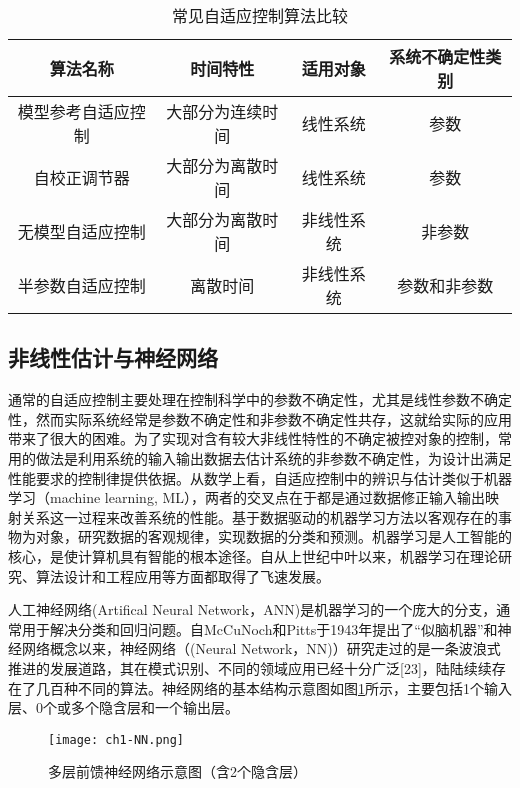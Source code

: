 \begin{table}
\centering
\caption{常见自适应控制算法比较}\label{tab:adaptive}
\begin{tabular*}{0.9\textwidth}{@{\extracolsep{\fill}}cccc}
\toprule
算法名称		&时间特性	&适用对象	&系统不确定性类别 \\
\midrule
模型参考自适应控制		&大部分为连续时间	&线性系统&参数\\
自校正调节器		&大部分为离散时间	& 线性系统&参数\\
无模型自适应控制		&大部分为离散时间	&非线性系统&非参数\\
半参数自适应控制		&离散时间&非线性系统	&参数和非参数\\
\bottomrule
\end{tabular*}
\end{table}

\subsection{非线性估计与神经网络}%

通常的自适应控制主要处理在控制科学中的参数不确定性，尤其是线性参数不确定性，然而实际系统经常是参数不确定性和非参数不确定性共存，这就给实际的应用带来了很大的困难。为了实现对含有较大非线性特性的不确定被控对象的控制，常用的做法是利用系统的输入输出数据去估计系统的非参数不确定性，为设计出满足性能要求的控制律提供依据。从数学上看，自适应控制中的辨识与估计类似于机器学习（machine learning, ML），两者的交叉点在于都是通过数据修正输入输出映射关系这一过程来改善系统的性能。基于数据驱动的机器学习方法以客观存在的事物为对象，研究数据的客观规律，实现数据的分类和预测。机器学习是人工智能的核心，是使计算机具有智能的根本途径。自从上世纪中叶以来，机器学习在理论研究、算法设计和工程应用等方面都取得了飞速发展。

人工神经网络(Artifical Neural Network，ANN)是机器学习的一个庞大的分支，通常用于解决分类和回归问题。自McCuNoch和Pitts于1943年提出了“似脑机器”和神经网络概念以来，神经网络（(Neural Network，NN)）研究走过的是一条波浪式推进的发展道路，其在模式识别、不同的领域应用已经十分广泛[23]，陆陆续续存在了几百种不同的算法。神经网络的基本结构示意图如图\ref{fig:MNN}所示，主要包括1个输入层、0个或多个隐含层和一个输出层。

\begin{figure}
 \centering
 \texttt{[image: ch1-NN.png]}
 \caption{多层前馈神经网络示意图（含2个隐含层）}\label{fig:MNN}
\end{figure}

